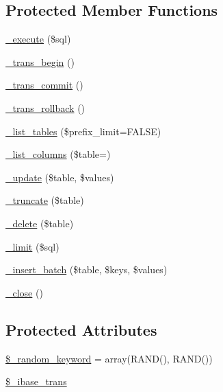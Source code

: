 \subsection*{Protected Member Functions}
\begin{DoxyCompactItemize}
\item 
\mbox{\hyperlink{class_c_i___d_b__ibase__driver_a114ab675d89bf8324a41785fb475e86d}{\+\_\+execute}} (\$sql)
\item 
\mbox{\hyperlink{class_c_i___d_b__ibase__driver_ac81ac882c1d54347d810199a15856aac}{\+\_\+trans\+\_\+begin}} ()
\item 
\mbox{\hyperlink{class_c_i___d_b__ibase__driver_a6fe7f373e0b11cfae23a5f41c0b35dda}{\+\_\+trans\+\_\+commit}} ()
\item 
\mbox{\hyperlink{class_c_i___d_b__ibase__driver_ad49a116b0776c26b53114c9093fd102a}{\+\_\+trans\+\_\+rollback}} ()
\item 
\mbox{\hyperlink{class_c_i___d_b__ibase__driver_a435c0f3ce54fe7daa178baa8532ebd54}{\+\_\+list\+\_\+tables}} (\$prefix\+\_\+limit=F\+A\+L\+SE)
\item 
\mbox{\hyperlink{class_c_i___d_b__ibase__driver_a7ccb7f9c301fe7f0a9db701254142b63}{\+\_\+list\+\_\+columns}} (\$table=\textquotesingle{}\textquotesingle{})
\item 
\mbox{\hyperlink{class_c_i___d_b__ibase__driver_a2540b03a93fa73ae74c10d0e16fc073e}{\+\_\+update}} (\$table, \$values)
\item 
\mbox{\hyperlink{class_c_i___d_b__ibase__driver_aa029600528fc1ce660a23ff4b4667f95}{\+\_\+truncate}} (\$table)
\item 
\mbox{\hyperlink{class_c_i___d_b__ibase__driver_a133ea8446ded52589bd22cc9163d0896}{\+\_\+delete}} (\$table)
\item 
\mbox{\hyperlink{class_c_i___d_b__ibase__driver_a3a02ea06541b8ecc25a33a61651562c8}{\+\_\+limit}} (\$sql)
\item 
\mbox{\hyperlink{class_c_i___d_b__ibase__driver_a1978e1358c812587a46e242630365099}{\+\_\+insert\+\_\+batch}} (\$table, \$keys, \$values)
\item 
\mbox{\hyperlink{class_c_i___d_b__ibase__driver_a4d9082658000e5ede8312067c6dda9db}{\+\_\+close}} ()
\end{DoxyCompactItemize}
\subsection*{Protected Attributes}
\begin{DoxyCompactItemize}
\item 
\mbox{\hyperlink{class_c_i___d_b__ibase__driver_a10213aa6e05f6d924d3277bb1d2fea00}{\$\+\_\+random\+\_\+keyword}} = array(\textquotesingle{}R\+A\+ND()\textquotesingle{}, \textquotesingle{}R\+A\+ND()\textquotesingle{})
\item 
\mbox{\hyperlink{class_c_i___d_b__ibase__driver_a515e622846336e361f281a522c025059}{\$\+\_\+ibase\+\_\+trans}}
\end{DoxyCompactItemize}


